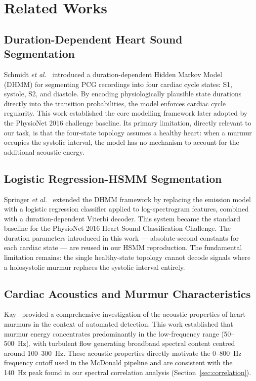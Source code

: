 \documentclass[conference]{IEEEtran}
\begin{document}
\section{Related Works}

\subsection{Duration-Dependent Heart Sound Segmentation}

Schmidt \textit{et al.}~\cite{schmidt2010} introduced a duration-dependent
Hidden Markov Model (DHMM) for segmenting PCG recordings into four
cardiac cycle states: S1, systole, S2, and diastole. By encoding
physiologically plausible state durations directly into the transition
probabilities, the model enforces cardiac cycle regularity. This work
established the core modelling framework later adopted by the
PhysioNet 2016 challenge baseline. Its primary limitation, directly
relevant to our task, is that the four-state topology assumes a healthy
heart: when a murmur occupies the systolic interval, the model has no
mechanism to account for the additional acoustic energy.

\subsection{Logistic Regression-HSMM Segmentation}

Springer \textit{et al.}~\cite{springer2016} extended the DHMM framework
by replacing the emission model with a logistic regression classifier
applied to log-spectrogram features, combined with a duration-dependent
Viterbi decoder. This system became the standard baseline for the
PhysioNet 2016 Heart Sound Classification Challenge. The duration
parameters introduced in this work --- absolute-second constants for
each cardiac state --- are reused in our HSMM reproduction.
The fundamental limitation remains: the single healthy-state topology
cannot decode signals where a holosystolic murmur replaces the systolic
interval entirely.

\subsection{Cardiac Acoustics and Murmur Characteristics}

Kay~\cite{kay2018} provided a comprehensive investigation of the acoustic
properties of heart murmurs in the context of automated detection.
This work established that murmur energy concentrates predominantly in
the low-frequency range (50--500~Hz), with turbulent flow generating
broadband spectral content centred around 100--300~Hz. These acoustic
properties directly motivate the 0--800~Hz frequency cutoff used in
the McDonald pipeline and are consistent with the 140~Hz peak found
in our spectral correlation analysis (Section~\ref{sec:correlation}).
\end{document}

